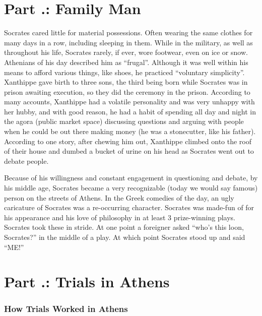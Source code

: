 \section{Part \thechapcount.\theseccount: Family Man}

Socrates cared little for material possessions. Often wearing the same clothes for many days in a row, including sleeping in them. While in the military, as well as throughout his life, Socrates rarely, if ever, wore footwear, even on ice or snow. Athenians of his day described him as “frugal”. Although it was well within his means to afford various things, like shoes, he practiced “voluntary simplicity”. Xanthippe gave birth to three sons, the third being born while Socrates was in prison awaiting execution, so they did the ceremony in the prison. According to many accounts, Xanthippe had a volatile personality and was very unhappy with her hubby, and with good reason, he had a habit of spending all day and night in the agora (public market space) discussing questions and arguing with people when he could be out there making money (he was a stonecutter, like his father). According to one story, after chewing him out, Xanthippe climbed onto the roof of their house and dumbed a bucket of urine on his head as Socrates went out to debate people.

Because of his willingness and constant engagement in questioning and debate, by his middle age, Socrates became a very recognizable (today we would say famous) person on the streets of Athens. In the Greek comedies of the day, an ugly caricature of Socrates was a re-occurring character. Socrates was made-fun of for his appearance and his love of philosophy in at least 3 prize-winning plays. Socrates took these in stride. At one point a foreigner asked “who’s this loon, Socrates?” in the middle of a play. At which point Socrates stood up and said “ME!”

\section{Part \thechapcount.\theseccount: Trials in Athens}

\subsubsection{How Trials Worked in Athens}

